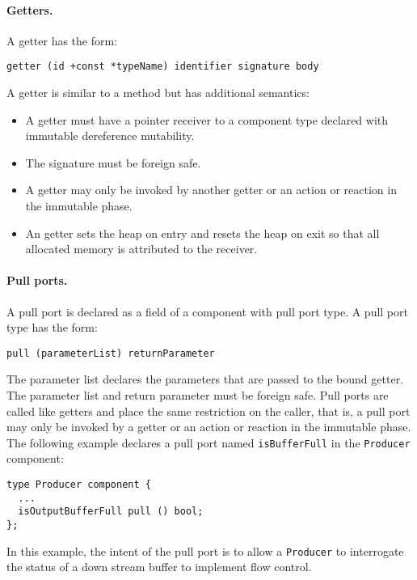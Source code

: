 \paragraph{Getters.}
A getter has the form:
\begin{verbatim}
getter (id +const *typeName) identifier signature body
\end{verbatim}
A getter is similar to a method but has additional semantics:
\begin{itemize}
\item A getter must have a pointer receiver to a component type declared with immutable dereference mutability.
\item The signature must be foreign safe.
\item A getter may only be invoked by another getter or an action or reaction in the immutable phase.
\item An getter sets the heap on entry and resets the heap on exit so that all allocated memory is attributed to the receiver.
\end{itemize}

\paragraph{Pull ports.}
A pull port is declared as a field of a component with pull port type.
A pull port type has the form:
\begin{verbatim}
pull (parameterList) returnParameter
\end{verbatim}
The parameter list declares the parameters that are passed to the bound getter.
The parameter list and return parameter must be foreign safe.
Pull ports are called like getters and place the same restriction on the caller, that is, a pull port may only be invoked by a getter or an action or reaction in the immutable phase.
The following example declares a pull port named \verb+isBufferFull+ in the \verb+Producer+ component:
\begin{verbatim}
type Producer component {
  ...
  isOutputBufferFull pull () bool;
};
\end{verbatim}
In this example, the intent of the pull port is to allow a \verb+Producer+ to interrogate the status of a down stream buffer to implement flow control.

